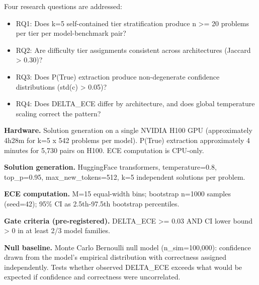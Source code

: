 
Four research questions are addressed:

\begin{itemize}
\item RQ1: Does k=5 self-contained tier stratification produce n >= 20 problems per tier per model-benchmark pair?
\item RQ2: Are difficulty tier assignments consistent across architectures (Jaccard > 0.30)?
\item RQ3: Does P(True) extraction produce non-degenerate confidence distributions (std(c) > 0.05)?
\item RQ4: Does DELTA\_ECE differ by architecture, and does global temperature scaling correct the pattern?
\end{itemize}

\textbf{Hardware.} Solution generation on a single NVIDIA H100 GPU (approximately 4h28m for k=5 x 542 problems per model). P(True) extraction approximately 4 minutes for 5,730 pairs on H100. ECE computation is CPU-only.

\textbf{Solution generation.} HuggingFace transformers, temperature=0.8, top\_p=0.95, max\_new\_tokens=512, k=5 independent solutions per problem.

\textbf{ECE computation.} M=15 equal-width bins; bootstrap n=1000 samples (seed=42); 95\% CI as 2.5th-97.5th bootstrap percentiles.

\textbf{Gate criteria (pre-registered).} DELTA\_ECE >= 0.03 AND CI lower bound > 0 in at least 2/3 model families.

\textbf{Null baseline.} Monte Carlo Bernoulli null model (n\_sim=100,000): confidence drawn from the model's empirical distribution with correctness assigned independently. Tests whether observed DELTA\_ECE exceeds what would be expected if confidence and correctness were uncorrelated.
